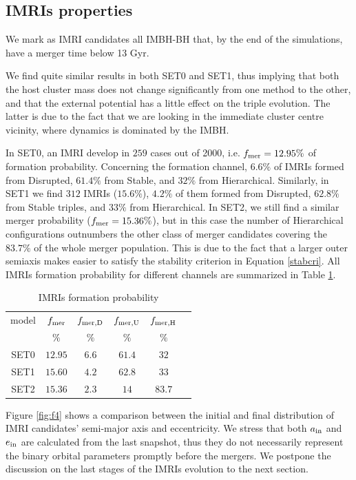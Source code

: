 \documentclass[twocolumn]{aastex62}
\newcommand{\inn}{{\rm in}}
\begin{document}
\subsection{IMRIs properties}

We mark as IMRI candidates all IMBH-BH that, by the end of the simulations, have a merger time below 13 Gyr. 

We find quite similar results in both SET0 and SET1, thus implying that both the host cluster mass does not change significantly from one method to the other, and that the external potential has a little effect on the triple evolution. The latter is due to the fact that we are looking in the immediate cluster centre vicinity, where dynamics is dominated by the IMBH.

In SET0, an IMRI develop in $259$ cases out of 2000, i.e. $f_{\rm mer} = 12.95\%$ of formation probability. Concerning the formation channel, $6.6\%$ of IMRIs formed from Disrupted, $61.4\%$ from Stable, and $32\%$ from Hierarchical. Similarly, in SET1 we find $312$ IMRIs ($15.6\%$), $4.2\%$ of them formed from Disrupted, $62.8\%$ from Stable triples, and $33\%$ from Hierarchical. In SET2, we still find a similar merger probability ($f_{\rm mer} = 15.36\%$), but in this case the number of Hierarchical configurations outnumbers the other class of merger candidates covering the $83.7\%$ of the whole merger population. This is due to the fact that a larger outer semiaxis makes easier to satisfy the stability criterion in Equation \ref{stabcri}.
All IMRIs formation probability for different channels are summarized in Table \ref{tab:t3}. 

\begin{table}
    \centering
    \caption{IMRIs formation probability}
    \begin{tabular}{cccccc}
        \hline
        \hline 
        model& $f_{\rm mer}$ & $f_{\rm mer,D}$ & $f_{\rm mer,U}$ & $f_{\rm mer,H}$\\
             & $\%$& $\%$& $\%$& $\%$\\
        \hline
		SET0 & $12.95$ & $6.6$ & $61.4$ & $32$ \\
		SET1 & $15.60$ & $4.2$ & $62.8$ & $33$ \\
		SET2 & $15.36$ & $2.3$ & $14$   & $83.7$ \\
        \hline
    \end{tabular}
    \label{tab:t3}
\end{table}


Figure \ref{fig:f4} shows a comparison between the initial and final distribution of IMRI candidates' semi-major axis and eccentricity. We stress that both $a_\inn$ and $e_\inn$ are calculated from the last snapshot, thus they do not necessarily represent the binary orbital parameters promptly before the mergers. We postpone the discussion on the last stages of the IMRIs evolution to the next section.
\end{document}
